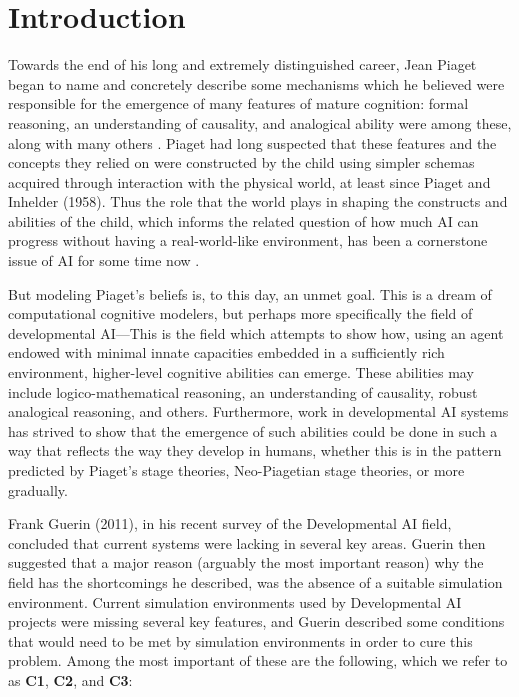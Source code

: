 \section{Introduction}
\label{sect:introduction}

Towards the end of his long and extremely distinguished career, Jean Piaget began to name and concretely describe some mechanisms which he believed were responsible for the emergence of many features of mature cognition: formal reasoning, an understanding of causality, and analogical ability were among these, along with many others \cite{Piaget1958,Piaget1974,Piaget2001}.
Piaget had long suspected that these features and the concepts they relied on were constructed by the child using simpler schemas acquired through interaction with the physical world, at least since Piaget and Inhelder (1958). Thus the role that the world plays in shaping the constructs and abilities of the child, which informs the related question of how much AI can progress without having a real-world-like environment, has been a cornerstone issue of AI for some time now \cite{Brooks1990,Brooks1991,Harnad1990}.

But modeling Piaget's beliefs is, to this day, an unmet goal. This is a dream of computational cognitive modelers, but perhaps more specifically the field of developmental AI---This is the field which attempts to show how, using an agent endowed with minimal innate capacities embedded in a sufficiently rich environment, higher-level cognitive abilities can emerge. These abilities may include logico-mathematical reasoning, an understanding of causality, robust analogical reasoning, and others. Furthermore, work in developmental AI systems has strived to show that the emergence of such abilities could be done in such a way that reflects the way they develop in humans, whether this is in the pattern predicted by Piaget's stage theories, Neo-Piagetian stage theories, or more gradually.

Frank Guerin (2011), in his recent survey of the Developmental AI field, concluded that current systems were lacking in several key areas\nocite{Guerin2011}. Guerin then suggested that a major reason (arguably the most important reason) why the field has the shortcomings he described, was the absence of a suitable simulation environment. Current simulation environments used by Developmental AI projects were missing several key features, and Guerin described some conditions that would need to be met by simulation environments in order to cure this problem. Among the most important of these are the following, which we refer to as \textbf{C1}, \textbf{C2}, and \textbf{C3}:


